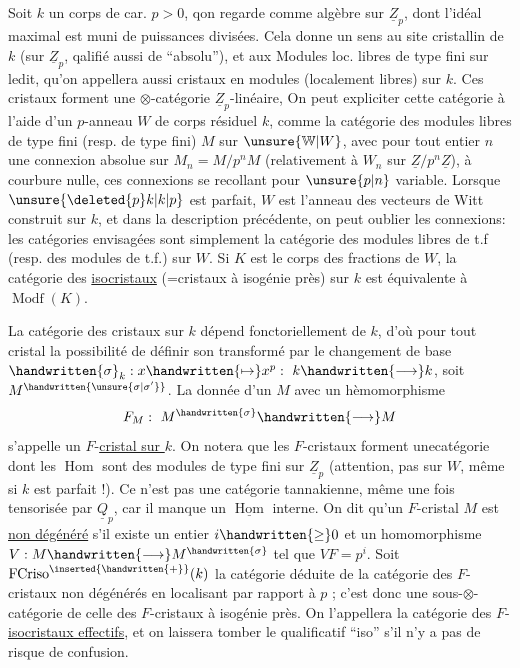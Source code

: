  Soit $k$ un corps de car. $p>0$, qon regarde comme algèbre sur $\underline{Z}_p$, dont l'idéal maximal est muni de puissances divisées. Cela donne un sens au site cristallin de $k$ (sur $\underline{Z}_p$, qalifié aussi de ``absolu''), et aux Modules loc. libres de type fini sur ledit, qu'on appellera aussi cristaux en modules (localement libres) sur $k$. Ces cristaux forment une $\otimes$-catégorie $\underline{Z}_p$-linéaire,  On peut expliciter cette catégorie à l'aide d'un $p$-anneau $W$ de corps résiduel $k$, comme la catégorie des modules libres de type fini (resp. de type fini) $M$ sur $\unsure{\mathbb{W}|W}$, avec pour tout entier $n$ une connexion absolue sur $M_n=M/p^nM$ (relativement à $W_n$ sur $\underline{Z}/p^n\underline{Z}$), à courbure nulle, ces connexions se recollant pour $\unsure{p|n}$ variable. Lorsque $\unsure{\deleted{p}k|k|p}$ est parfait, $W$ est l'anneau des vecteurs de Witt construit sur $k$, et dans la description précédente, on peut oublier les connexions: les catégories envisagées sont simplement la catégorie des modules libres de t.f (resp. des modules de t.f.) sur $W$. Si $K$ est le corps des fractions de $W$, la catégorie des \uline{isocristaux}  (=cristaux à isogénie près) sur $k$ est équivalente à $\operatorname{Modf}(K)$. 

 La catégorie des cristaux sur $k$ dépend fonctoriellement de $k$, d'où pour tout cristal la possibilité de définir son transformé par le changement de base $\handwritten{\sigma}_k:x\handwritten{\mapsto}x^p:\ k\handwritten{\longrightarrow}k$, soit $M^{\handwritten{\unsure{\sigma|\sigma'}}}$. La donnée d'un $M$ avec un hèmomorphisme
\[
F_M:\ M^{\handwritten{\sigma}}\handwritten{\longrightarrow}M
\]
s'appelle un $F$\handwritten{\unsure{(}}-\uline{cristal sur $k$}. On notera que les $F$-cristaux forment une\inserted{$\otimes$-}catégorie dont les $\operatorname{Hom}$ sont des modules de type fini sur $\underline{Z}_p$ (attention, pas sur $W$, même si $k$ est parfait !). Ce n'est pas une  catégorie tannakienne, même une fois tensorisée par $\underline{Q}_p$, car il manque
un $\underline{\operatorname{Hom}}$ interne. On dit qu'un $F$-cristal $M$ est \uline{non dégénéré} s'il existe un entier $i\handwritten{\geq}0$ et un homomorphisme $V:M\handwritten{\longrightarrow}M^{\handwritten{\sigma}}$ tel que $VF=p^i$. Soit $\operatorname{FCriso}^{\inserted{\handwritten{+}}}(k)$ la catégorie  déduite de la catégorie des  $F$-cristaux non dégénérés en localisant par rapport à $p$ ; c'est donc une sous-$\otimes$-catégorie de celle des $F$-cristaux à isogénie près. On l'appellera la catégorie des $F$-\uline{isocristaux effectifs}, et on laissera tomber le qualificatif ``iso'' s'il n'y a pas de risque de confusion.

